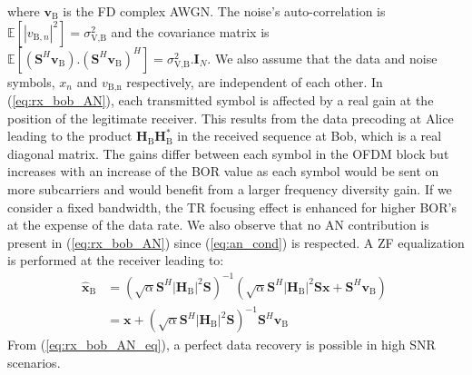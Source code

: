 \documentclass[journal,comsoc]{IEEEtran}
\newcommand{\module}[1]{\left|#1\right|}
\newcommand{\EX}[1]{\mathbb{E} \left[#1\right]}%
\newcommand{\HB}{\textbf{H}_{\text{B}}}
\newcommand{\spread}{\textbf{S}}
\begin{document}
where $\textbf{v}_\text{B}$ is the FD complex AWGN. The noise's auto-correlation is $\EX{|v_{\text{B},n}|^2}  = \sigma_{\text{V,B}}^2$ and the covariance matrix is $\EX{(\spread^H  \textbf{v}_\text{B}) . (\spread^H \textbf{v}_\text{B})^H} = \sigma_{\text{V,B}}^2 . \textbf{I}_N$. We also assume that the data and noise symbols,  $x_n$ and $v_{\text{B,n}}$ respectively, are independent of each other. In (\ref{eq:rx_bob_AN}), each transmitted symbol is affected by a real gain at the position of the legitimate receiver. This results from the data precoding at Alice leading to the product $\HB\HB^*$ in the received sequence at Bob, which is a real diagonal matrix. The gains differ between each symbol in the OFDM block but increases with an increase of the BOR value as each symbol would be sent on more subcarriers and would benefit from a larger frequency diversity gain. If we consider a fixed bandwidth, the TR focusing effect is enhanced for higher BOR's at the expense of the data rate. We also observe that no AN contribution is present in (\ref{eq:rx_bob_AN}) since (\ref{eq:an_cond}) is respected. A ZF equalization is performed at the receiver leading to:
\begin{equation}
\begin{split}
\hat{\textbf{x}}_{\text{B}} &= \left( \sqrt{\alpha} \spread^H \module{\HB}^2 \spread \right)^{-1}  \left(\sqrt{\alpha}  \spread^H\module{\HB}^2 \spread \textbf{x}   +    \spread^H \textbf{v}_\text{B}\right) \\
&= \textbf{x} + \left( \sqrt{\alpha} \spread^H \module{\HB}^2 \spread \right)^{-1} \spread^H \textbf{v}_\text{B}
\end{split}
\
\label{eq:rx_bob_AN_eq}
\end{equation}
From (\ref{eq:rx_bob_AN_eq}), a perfect data recovery is possible in high SNR scenarios.



%
\end{document}
